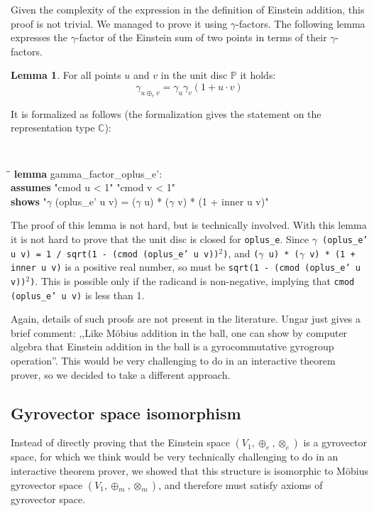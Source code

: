 \documentclass[a4paper]{article}
\newcommand{\tab}{\hspace{5mm}}
\theoremstyle{definition}
\newtheorem{lemma}[theorem]{Lemma}
\begin{document}
Given the complexity of the expression in the definition of Einstein
addition, this proof is not trivial. We managed to prove it using
$\gamma$-factors. The following lemma expresses the $\gamma$-factor of
the Einstein sum of two points in terms of their $\gamma$-factors.

\begin{lemma}\label{lemma:gammaeinstein}
  For all points $u$ and $v$ in the unit disc $\mathbb{P}$ it holds:
  $$\gamma_{u\oplus_e v} = \gamma_u\gamma_v(1+u\cdot v)$$
\end{lemma}

\noindent It is formalized as follows (the formalization gives the
statement on the representation type $\mathbb{C}$):

{\tt
\begin{small}
\begin{tabbing}
\tab\=\tab\=\kill
{\bf lemma} gamma\_factor\_oplus\_e':\\
\>  {\bf assumes} "cmod u < 1" "cmod v < 1"\\
\>  {\bf shows} "$\gamma$ (oplus\_e' u v) = ($\gamma$ u) * ($\gamma$ v) * (1 + inner u v)"
\end{tabbing}
\end{small}
}

\noindent The proof of this lemma is not hard, but is technically
involved. With this lemma it is not hard to prove that the unit disc
is closed for \texttt{oplus\_e}. Since \texttt{$\gamma$ (oplus\_e' u
  v) = 1 / sqrt(1 - (cmod (oplus\_e' u v))$^2$)}, and
\texttt{($\gamma$ u) * ($\gamma$ v) * (1 + inner u v)} is a positive
real number, so must be \texttt{sqrt(1 - (cmod (oplus\_e' u
  v))$^2$)}. This is possible only if the radicand is non-negative,
implying that \texttt{cmod (oplus\_e' u v)} is less than 1.

Again, details of such proofs are not present in the literature. Ungar
just gives a brief comment: ,,Like M\"obius addition in the ball, one
can show by computer algebra that Einstein addition in the ball is a
gyrocommutative gyrogroup operation''. This would be very challenging
to do in an interactive theorem prover, so we decided to take a
different approach.



\subsection{Gyrovector space isomorphism}

Instead of directly proving that the Einstein space
$(V_1, \oplus_e, \otimes_{e})$ is a gyrovector space, for which we
think would be very technically challenging to do in an interactive
theorem prover, we showed that this structure is isomorphic to
M\"obius gyrovector space $(V_1, \oplus_m, \otimes_{m})$, and
therefore must satisfy axioms of gyrovector space.
\end{document}
